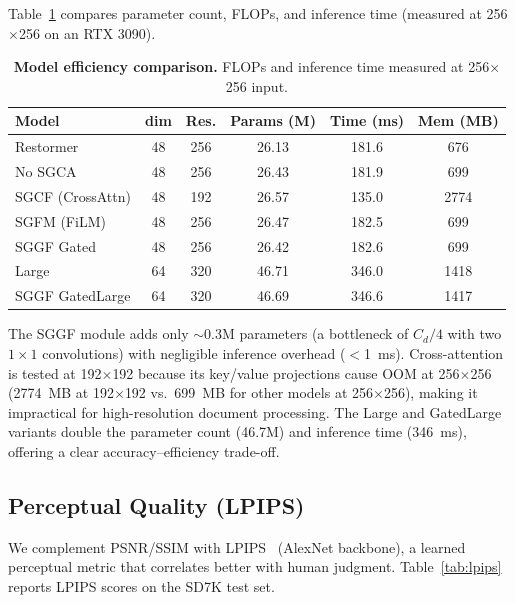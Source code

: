 \documentclass[11pt]{article}
\begin{document}
Table~\ref{tab:efficiency} compares parameter count, FLOPs, and inference time (measured at 256$\times$256 on an RTX 3090).

\begin{table}[t]
\centering
\caption{\textbf{Model efficiency comparison.} FLOPs and inference time measured at 256$\times$256 input.}
\label{tab:efficiency}
\begin{tabular}{@{}lccccc@{}}
\toprule
\textbf{Model} & \textbf{dim} & \textbf{Res.} & \textbf{Params (M)} & \textbf{Time (ms)} & \textbf{Mem (MB)} \\
\midrule
Restormer              & 48 & 256 & 26.13 & 181.6 & 676 \\
No SGCA                & 48 & 256 & 26.43 & 181.9 & 699 \\
SGCF (CrossAttn)       & 48 & 192 & 26.57 & 135.0 & 2774 \\
SGFM (FiLM)            & 48 & 256 & 26.47 & 182.5 & 699 \\
SGGF Gated             & 48 & 256 & 26.42 & 182.6 & 699 \\
Large                  & 64 & 320 & 46.71 & 346.0 & 1418 \\
SGGF GatedLarge        & 64 & 320 & 46.69 & 346.6 & 1417 \\
\bottomrule
\end{tabular}
\end{table}

The SGGF module adds only $\sim$0.3M parameters (a bottleneck of $C_d/4$ with two $1\times1$ convolutions) with negligible inference overhead ($<$1~ms).
Cross-attention is tested at 192$\times$192 because its key/value projections cause OOM at 256$\times$256 (2774~MB at 192$\times$192 vs.~699~MB for other models at 256$\times$256), making it impractical for high-resolution document processing.
The Large and GatedLarge variants double the parameter count (46.7M) and inference time (346~ms), offering a clear accuracy--efficiency trade-off.

\subsection{Perceptual Quality (LPIPS)}

We complement PSNR/SSIM with LPIPS~\cite{zhang2018lpips} (AlexNet backbone), a learned perceptual metric that correlates better with human judgment.
Table~\ref{tab:lpips} reports LPIPS scores on the SD7K test set.
\end{document}
